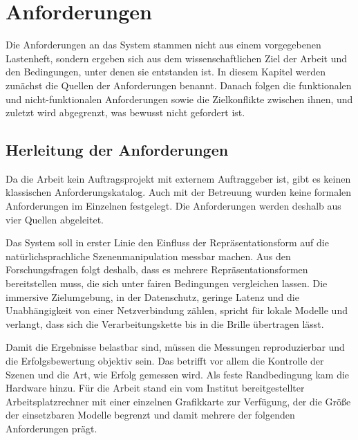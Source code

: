 
\chapter{Anforderungen}
\label{ch:anforderungen}

Die Anforderungen an das System stammen nicht aus einem vorgegebenen Lastenheft, sondern ergeben sich aus dem wissenschaftlichen Ziel der Arbeit und den Bedingungen, unter denen sie entstanden ist.
In diesem Kapitel werden zunächst die Quellen der Anforderungen benannt.
Danach folgen die funktionalen und nicht-funktionalen Anforderungen sowie die Zielkonflikte zwischen ihnen, und zuletzt wird abgegrenzt, was bewusst nicht gefordert ist.


\section{Herleitung der Anforderungen}
\label{sec:anf-herleitung}

Da die Arbeit kein Auftragsprojekt mit externem Auftraggeber ist, gibt es keinen klassischen Anforderungskatalog.
Auch mit der Betreuung wurden keine formalen Anforderungen im Einzelnen festgelegt.
Die Anforderungen werden deshalb aus vier Quellen abgeleitet.

Das System soll in erster Linie den Einfluss der Repräsentationsform auf die natürlichsprachliche Szenenmanipulation messbar machen.
Aus den Forschungsfragen folgt deshalb, dass es mehrere Repräsentationsformen bereitstellen muss, die sich unter fairen Bedingungen vergleichen lassen.
Die immersive Zielumgebung, in der Datenschutz, geringe Latenz und die Unabhängigkeit von einer Netzverbindung zählen, spricht für lokale Modelle und verlangt, dass sich die Verarbeitungskette bis in die Brille übertragen lässt.

Damit die Ergebnisse belastbar sind, müssen die Messungen reproduzierbar und die Erfolgsbewertung objektiv sein.
Das betrifft vor allem die Kontrolle der Szenen und die Art, wie Erfolg gemessen wird.
Als feste Randbedingung kam die Hardware hinzu.
Für die Arbeit stand ein vom Institut bereitgestellter Arbeitsplatzrechner mit einer einzelnen Grafikkarte zur Verfügung, der die Größe der einsetzbaren Modelle begrenzt und damit mehrere der folgenden Anforderungen prägt.


